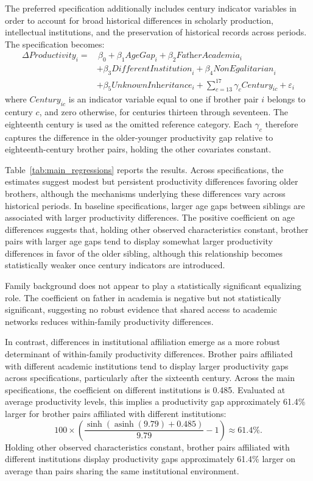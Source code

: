 The preferred specification additionally includes century indicator variables in order to account for broad historical differences in scholarly production, intellectual institutions, and the preservation of historical records across periods. The specification becomes:
\begin{align*}
\Delta Productivity_i
=
&\,
\beta_0
+
\beta_1 \textit{AgeGap}_i
+
\beta_2 \textit{FatherAcademia}_i
\\
&+
\beta_3 \textit{DifferentInstitution}_i
+
\beta_4 \textit{NonEgalitarian}_i
\\
&+
\beta_5 \textit{UnknownInheritance}_i
+
\sum_{c=13}^{17} \gamma_c Century_{ic}
+
\varepsilon_i
\end{align*}
where $Century_{ic}$ is an indicator variable equal to one if brother pair $i$ belongs to century $c$, and zero otherwise, for centuries thirteen through seventeen. The eighteenth century is used as the omitted reference category. Each $\gamma_c$ therefore captures the difference in the older-younger productivity gap relative to eighteenth-century brother pairs, holding the other covariates constant.

Table~\ref{tab:main_regressions} reports the results. Across specifications, the estimates suggest modest but persistent productivity differences favoring older brothers, although the mechanisms underlying these differences vary across historical periods. In baseline specifications, larger age gaps between siblings are associated with larger productivity differences. The positive coefficient on age differences suggests that, holding other observed characteristics constant, brother pairs with larger age gaps tend to display somewhat larger productivity differences in favor of the older sibling, although this relationship becomes statistically weaker once century indicators are introduced.

Family background does not appear to play a statistically significant equalizing role. The coefficient on father in academia is negative but not statistically significant, suggesting no robust evidence that shared access to academic networks reduces within-family productivity differences.

In contrast, differences in institutional affiliation emerge as a more robust determinant of within-family productivity differences. Brother pairs affiliated with different academic institutions tend to display larger productivity gaps across specifications, particularly after the sixteenth century. Across the main specifications, the coefficient on different institutions is 0.485. Evaluated at average productivity levels, this implies a productivity gap approximately 61.4\% larger for brother pairs affiliated with different institutions:
\[
100 \times
\left(
\frac{
\sinh\left(
\operatorname{asinh}(9.79)+0.485
\right)
}{
9.79
}
-1
\right)
\approx 61.4\%.
\]
Holding other observed characteristics constant, brother pairs affiliated with different institutions display productivity gaps approximately 61.4\% larger on average than pairs sharing the same institutional environment.

